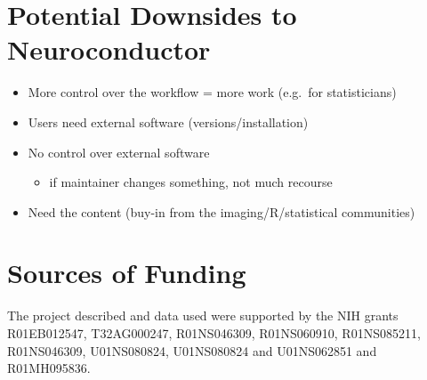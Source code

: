 \documentclass[final]{beamer}\usepackage[]{graphicx}\usepackage[]{color}
\begin{document}
\begin{frame}[fragile]
\begin{table}[!htb]
\begin{minipage}{0.36\linewidth}

\vspace*{-0.8cm}
\section{Potential Downsides to Neuroconductor}
\begin{itemize}
\item More control over the workflow = more work (e.g.~for statisticians)
\item Users need external software (versions/installation)
\item No control over external software
  \begin{itemize}
    \item if maintainer changes something, not much recourse
  \end{itemize}
\item Need the content (buy-in from the imaging/R/statistical communities)
\end{itemize}


\section{Sources of Funding}
{\scriptsize
The project described and data used were supported by the NIH grants R01EB012547, T32AG000247, R01NS046309, R01NS060910, R01NS085211, R01NS046309, U01NS080824, U01NS080824 and U01NS062851 and R01MH095836.
}



\end{minipage}
\end{table}
\end{frame}
\end{document}
